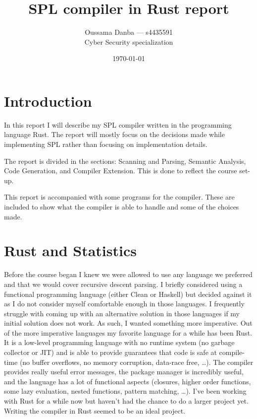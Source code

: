 \documentclass{article}
\title{SPL compiler in Rust report}
\author{Oussama Danba --- s4435591\\Cyber Security specialization}
\date{\today}
\begin{document}
\maketitle

\section{Introduction}
In this report I will describe my SPL compiler written in the programming language Rust. The report will mostly focus on the decisions made while implementing SPL rather than focusing on implementation details.

The report is divided in the sections: Scanning and Parsing, Semantic Analysis, Code Generation, and Compiler Extension. This is done to reflect the course set-up.

This report is accompanied with some programs for the compiler. These are included to show what the compiler is able to handle and some of the choices made.

\section{Rust and Statistics}
Before the course began I knew we were allowed to use any language we preferred and that we would cover recursive descent parsing. I briefly considered using a functional programming language (either Clean or Haskell) but decided against it as I do not consider myself comfortable enough in those languages. I frequently struggle with coming up with an alternative solution in those languages if my initial solution does not work. As such, I wanted something more imperative. Out of the more imperative languages my favorite language for a while has been Rust. It is a low-level programming language with no runtime system (no garbage collector or JIT) and is able to provide guarantees that code is safe at compile-time (no buffer overflows, no memory corruption, data-race free, \dots). The compiler provides really useful error messages, the package manager is incredibly useful, and the language has a lot of functional aspects (closures, higher order functions, some lazy evaluation, nested functions, pattern matching, \dots). I've been working with Rust for a while now but haven't had the chance to do a larger project yet. Writing the compiler in Rust seemed to be an ideal project.
\end{document}
